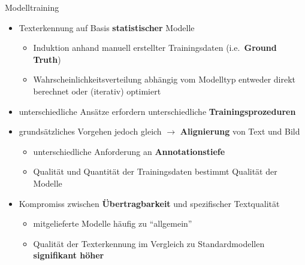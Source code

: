 \documentclass{bbawslides}
\begin{document}
\begin{bbawslide}{Modelltraining}
  \vspace*{7mm}%
  \centerslidestrue%
  \begin{itemize}
    \item Texterkennung auf Basis \textbf{statistischer} Modelle
    \begin{itemize}\small
      \item Induktion anhand manuell erstellter Trainingsdaten (i.e.~\textbf{Ground Truth})
      \item Wahrscheinlichkeitsverteilung abhängig vom Modelltyp entweder direkt berechnet oder (iterativ) optimiert
    \end{itemize}
    \item unterschiedliche Ansätze erfordern unterschiedliche \textbf{Trainingsprozeduren}
    \item grundsätzliches Vorgehen jedoch gleich $\rightarrow$ \textbf{Alignierung} von Text und Bild
    \begin{itemize}\small
      \item unterschiedliche Anforderung an \textbf{Annotationstiefe}
      \item Qualität und Quantität der Trainingsdaten bestimmt Qualität der Modelle
    
    \end{itemize}
    \item Kompromiss zwischen \textbf{Übertragbarkeit} und spezifischer Textqualität
    \begin{itemize}\small
      \item mitgelieferte Modelle häufig zu \enquote{allgemein}
      \item Qualität der Texterkennung im Vergleich zu Standardmodellen \textbf{signifikant höher} 
    \end{itemize}
  \end{itemize}
\end{bbawslide}

\renewcommand{\footerText}{\tiny 4. August 2017, DH-Kolloquium, BBAW\hspace{4cm} Image by Uwe Springmann, CC BY-SA 4.0}
\end{document}
